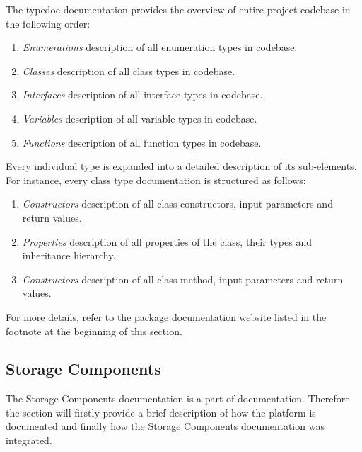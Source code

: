 The typedoc documentation provides the overview of entire \lpas{} project codebase in the following order:
\begin{enumerate}
    \item \textit{Enumerations} description of all enumeration types in codebase.
    \item \textit{Classes} description of all class types in codebase.
    \item \textit{Interfaces} description of all interface types in codebase.
    \item \textit{Variables} description of all variable types in codebase.
    \item \textit{Functions} description of all function types in codebase.
\end{enumerate}

Every individual type is expanded into a detailed description of its sub-elements. For instance, every class type documentation is structured as follows:
\begin{enumerate}
    \item \textit{Constructors} description of all class constructors, input parameters and return values.
    \item \textit{Properties} description of all properties of the class, their types and inheritance hierarchy.
    \item \textit{Constructors} description of all class method, input parameters and return values.
\end{enumerate}

For more details, refer to the package documentation website listed in the footnote at the beginning of this section.

\subsection{Storage Components}

The Storage Components documentation is a part of \lpa{} documentation. Therefore the section will firstly provide a brief description of how the \lpa{} platform is documented and finally how the Storage Components documentation was integrated.

